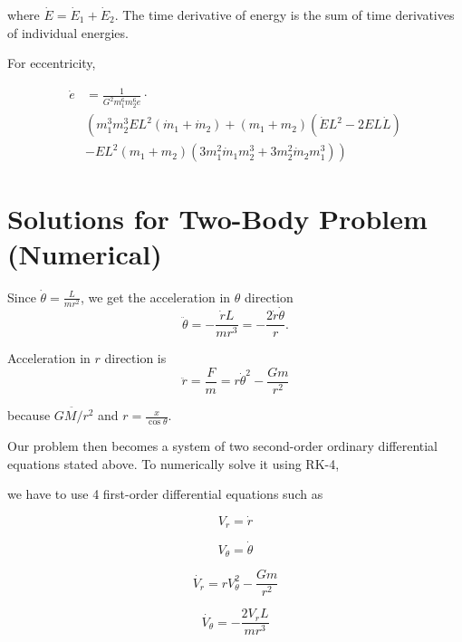 \documentclass{article}
\begin{document}
where $\dot E = \dot E_1 + \dot E_2$. The time derivative of energy is the sum of time derivatives of individual energies.


For eccentricity,

\begin{equation}
    \begin{split}
        \dot e 
        & = \frac{1}{G^2 m_1^6 m_2^6 e}  \cdot \\
        &  \left(m_1^3 m_2^3 EL^2 (\dot m_1 + \dot m_2) + (m_1 + m_2)(\dot E L^2 - 2 E L \dot L) \right.\\
        & \left. - EL^2(m_1 + m_2) (3 m_1^2 \dot m_1 m_2^3+ 3m_2^2 \dot m_2 m_1^3) \right)
    \end{split}
\end{equation}



\section{Solutions for Two-Body Problem (Numerical)}

Since $\dot{\theta} = \frac{L}{mr^2}$, we get the acceleration in $\theta$ direction
\begin{equation}
    \ddot{\theta} = - \frac{\dot{r} L}{mr^3} = -\frac{2\dot{r}\dot{\theta}}{r}.
\end{equation}

Acceleration in $r$ direction is
\begin{equation}
    \ddot{r} = \frac{F}{m} = r \dot{\theta}^2 - \frac{Gm}{r^2}
\end{equation}

because $\ddot{GM/r^2}$ and $r = \frac{x}{\cos{\theta}}$.

Our problem then becomes a system of two second-order ordinary differential equations stated above.
To numerically solve it using RK-4,

we have to use 4 first-order differential equations such as 

\begin{equation}
    V_r = \dot{r}
\end{equation}

\begin{equation}
    V_\theta = \dot{\theta}
\end{equation}

\begin{equation}
    \dot{V_r} = r V_\theta ^2 - \frac{Gm}{r^2}
\end{equation}

\begin{equation}
    \dot{V_\theta} = - \frac{2V_r L}{mr^3} 
\end{equation}
\end{document}

